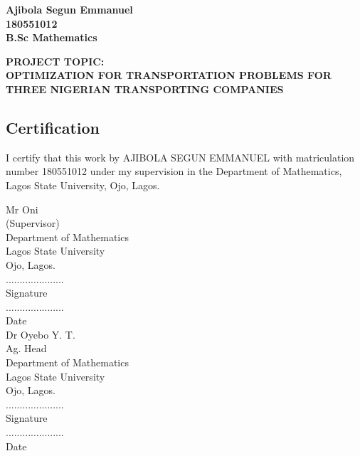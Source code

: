 \documentclass{article}
\begin{document}
	\begin{center}
	\Huge\textbf{Ajibola Segun Emmanuel} \\
	\vspace{5mm} %
	\Huge\textbf{180551012} \\
	\vspace{5mm} %
	\Huge\textbf{B.Sc Mathematics} \\ 
	\end{center}
	\vspace{50mm} %
	\begin{center}
	\Large\textbf{PROJECT TOPIC:} \\
	\vspace{5mm} %
	\Huge\textbf{\Huge OPTIMIZATION FOR TRANSPORTATION PROBLEMS FOR THREE NIGERIAN TRANSPORTING COMPANIES}\par
	\end{center}

\newpage
\begin{center}
	\subsection{Certification}
\end{center}

I certify that this work by AJIBOLA SEGUN EMMANUEL with matriculation number 180551012 under my supervision in the Department of Mathematics, Lagos State University, Ojo, Lagos.

\vspace{30mm}

\begin{multicols}{2}

\noindent
Mr Oni \\ 
(Supervisor) \\ 
Department of Mathematics \\ 
Lagos State University \\ 
Ojo, Lagos. \\ 

\noindent
..................... \\
Signature \\
..................... \\
Date \\

\noindent
Dr Oyebo Y. T. \\
Ag. Head \\
Department of Mathematics \\
Lagos State University \\
Ojo, Lagos. \\

\noindent
..................... \\
Signature \\
..................... \\
Date \\

\end{multicols}
\end{document}
